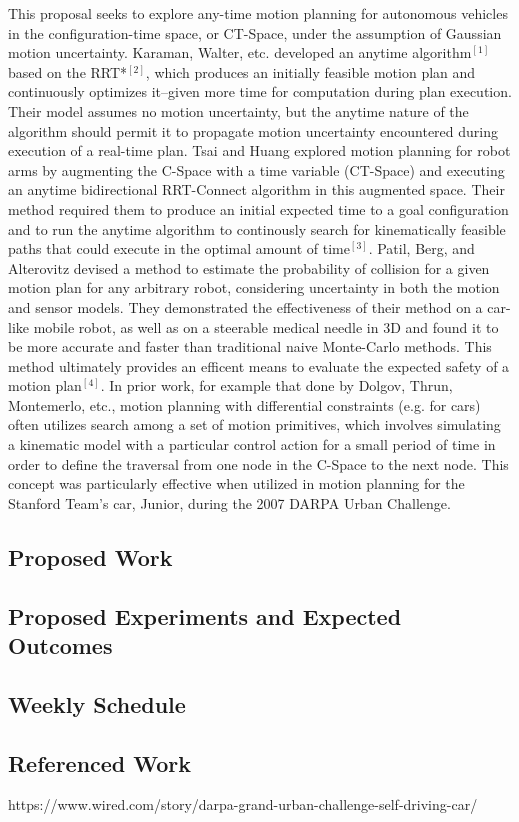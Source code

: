 \documentclass[12pt]{article}
\begin{document}
This proposal seeks to explore any-time motion planning for autonomous vehicles in the configuration-time space, or CT-Space, under the assumption of Gaussian motion uncertainty. Karaman, Walter, etc. developed an anytime algorithm$^{[1]}$ based on the RRT*$^{[2]}$, which produces an initially feasible motion plan and continuously optimizes it--given more time for computation during plan execution. Their model assumes no motion uncertainty, but the anytime nature of the algorithm should permit it to propagate motion uncertainty encountered during execution of a real-time plan. Tsai and Huang explored motion planning for robot arms by augmenting the C-Space with a time variable (CT-Space) and executing an anytime bidirectional RRT-Connect algorithm in this augmented space. Their method required them to produce an initial expected time to a goal configuration and to run the anytime algorithm to continously search for kinematically feasible paths that could execute in the optimal amount of time$^{[3]}$. Patil, Berg, and Alterovitz devised a method to estimate the probability of collision for a given motion plan for any arbitrary robot, considering uncertainty in both the motion and sensor models. They demonstrated the effectiveness of their method on a car-like mobile robot, as well as on a steerable medical needle in 3D and found it to be more accurate and faster than traditional naive Monte-Carlo methods. This method ultimately provides an efficent means to evaluate the expected safety of a motion plan$^{[4]}$. In prior work, for example that done by Dolgov, Thrun, Montemerlo, etc., motion planning with differential constraints (e.g. for cars) often utilizes search among a set of motion primitives, which involves simulating a kinematic model with a particular control action for a small period of time in order to define the traversal from one node in the C-Space to the next node. This concept was particularly effective when utilized in motion planning for the Stanford Team's car, Junior, during the 2007 DARPA Urban Challenge.

\subsection*{Proposed Work}

\subsection*{Proposed Experiments and Expected Outcomes}

\subsection*{Weekly Schedule}

\subsection*{Referenced Work}
https://www.wired.com/story/darpa-grand-urban-challenge-self-driving-car/
\end{document}

